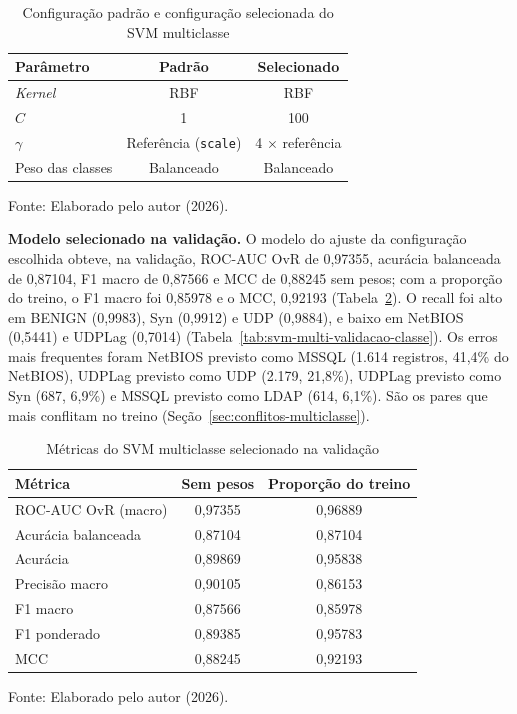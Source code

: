 \documentclass[
    12pt,                %
    openright,           %
    oneside,             %
    a4paper,             %
    english,             %
    brazil               %
]{abntex2}
\begin{document}
\begin{table}
\centering
\caption{Configuração padrão e configuração selecionada do SVM multiclasse}
\label{tab:svm-multi-config-comparacao}
\begin{tabular}{lcc}
\hline
Parâmetro & Padrão & Selecionado \\
\hline
\textit{Kernel} & RBF & RBF \\
$C$ & 1 & 100 \\
$\gamma$ & Referência (\texttt{scale}) & 4 $\times$ referência \\
Peso das classes & Balanceado & Balanceado \\
\hline
\end{tabular}
\par\smallskip
Fonte: Elaborado pelo autor (2026).
\end{table}
 
\textbf{Modelo selecionado na validação.} O modelo do ajuste da configuração escolhida obteve, na validação, ROC-AUC OvR de 0,97355, acurácia balanceada de 0,87104, F1 macro de 0,87566 e MCC de 0,88245 sem pesos; com a proporção do treino, o F1 macro foi 0,85978 e o MCC, 0,92193 (Tabela~\ref{tab:svm-multi-validacao}). O recall foi alto em BENIGN (0,9983), Syn (0,9912) e UDP (0,9884), e baixo em NetBIOS (0,5441) e UDPLag (0,7014) (Tabela~\ref{tab:svm-multi-validacao-classe}). Os erros mais frequentes foram NetBIOS previsto como MSSQL (1.614 registros, 41,4\% do NetBIOS), UDPLag previsto como UDP (2.179, 21,8\%), UDPLag previsto como Syn (687, 6,9\%) e MSSQL previsto como LDAP (614, 6,1\%). São os pares que mais conflitam no treino (Seção~\ref{sec:conflitos-multiclasse}).
 
\begin{table}
\centering
\caption{Métricas do SVM multiclasse selecionado na validação}
\label{tab:svm-multi-validacao}
\begin{tabular}{lcc}
\hline
Métrica & Sem pesos & Proporção do treino \\
\hline
ROC-AUC OvR (macro) & 0,97355 & 0,96889 \\
Acurácia balanceada & 0,87104 & 0,87104 \\
Acurácia & 0,89869 & 0,95838 \\
Precisão macro & 0,90105 & 0,86153 \\
F1 macro & 0,87566 & 0,85978 \\
F1 ponderado & 0,89385 & 0,95783 \\
MCC & 0,88245 & 0,92193 \\
\hline
\end{tabular}
\par\smallskip
Fonte: Elaborado pelo autor (2026).
\end{table}
 
\end{document}
